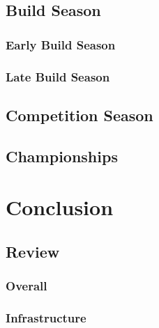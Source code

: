 \documentclass[11pt]{report}
\begin{document}
\section{Build Season}
\subsection{Early Build Season}
\subsection{Late Build Season}
\section{Competition Season}
\section{Championships}


\chapter{Conclusion}

\section{Review}
\subsection{Overall}
\subsection{Infrastructure}


\printbibliography[heading=bibintoc]
\end{document}
